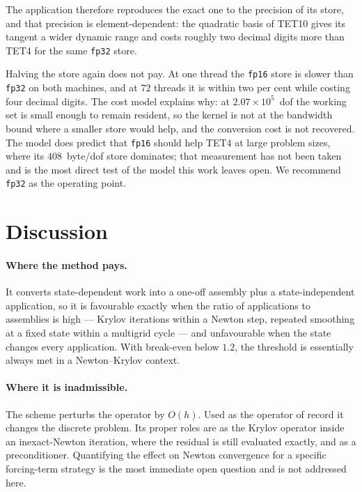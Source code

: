 \documentclass[11pt]{article}
\begin{document}
The application therefore reproduces the exact one to the precision of its
store, and that precision is element-dependent: the quadratic basis of TET10
gives its tangent a wider dynamic range and costs roughly two decimal digits
more than TET4 for the same \texttt{fp32} store.

Halving the store again does not pay.  At one thread the \texttt{fp16} store is
slower than \texttt{fp32} on both machines, and at $72$ threads it is within two
per cent while costing four decimal digits.  The cost model explains why: at
$2.07\times10^{5}$~dof the working set is small enough to remain resident, so
the kernel is not at the bandwidth bound where a smaller store would help, and
the conversion cost is not recovered.  The model does predict that
\texttt{fp16} should help TET4 at large problem sizes, where its
$408$~byte/dof store dominates; that measurement has not been taken and is the
most direct test of the model this work leaves open.  We recommend
\texttt{fp32} as the operating point.

\section{Discussion}
\label{sec:discussion}

\paragraph{Where the method pays.}  It converts state-dependent work into a one-off
assembly plus a state-independent application, so it is favourable exactly when
the ratio of applications to assemblies is high --- Krylov iterations within a
Newton step, repeated smoothing at a fixed state within a multigrid cycle --- and
unfavourable when the state changes every application.  With break-even below
$1.2$, the threshold is essentially always met in a Newton--Krylov context.

\paragraph{Where it is inadmissible.}  The scheme perturbs the operator by $O(h)$.
Used as the operator of record it changes the discrete problem.  Its proper roles
are as the Krylov operator inside an inexact-Newton iteration, where the residual
is still evaluated exactly, and as a preconditioner.  Quantifying the effect on
Newton convergence for a specific forcing-term strategy is the most immediate
open question and is not addressed here.
\end{document}
